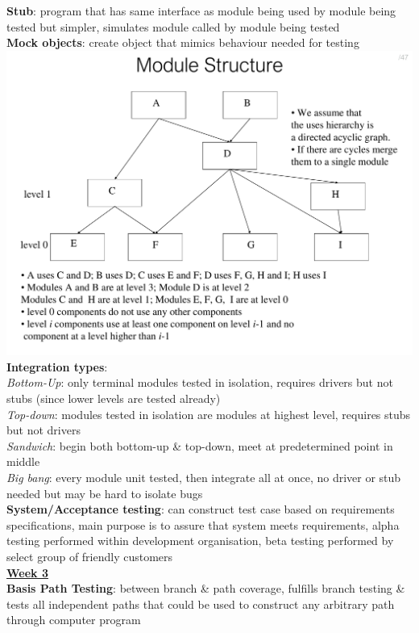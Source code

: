 \documentclass[a4paper]{article}
\begin{document}
\begin{multicols}{3}
        \textbf{Stub}: program that has same interface as module being used by module being tested but simpler, simulates module called by module being tested\\
        \textbf{Mock objects}: create object that mimics behaviour needed for testing\\
        \includegraphics[width=\linewidth]{102.pdf}\\
        \textbf{Integration types}:\\
        \textit{Bottom-Up}: only terminal modules tested in isolation, requires drivers but not stubs (since lower levels are tested already)\\
        \textit{Top-down}: modules tested in isolation are modules at highest level, requires stubs but not drivers\\
        \textit{Sandwich}: begin both bottom-up \& top-down, meet at predetermined point in middle\\
        \textit{Big bang}: every module unit tested, then integrate all at once, no driver or stub needed but may be hard to isolate bugs\\
        \textbf{System/Acceptance testing}: can construct test case based on requirements specifications, main purpose is to assure that system meets requirements, alpha testing performed within development organisation, beta testing performed by select group of friendly customers\\
        \underline{\textbf{Week 3}}\\
        \textbf{Basis Path Testing}: between branch \& path coverage, fulfills branch testing \& tests all independent paths that could be used to construct any arbitrary path through computer program\\

\end{multicols}
\end{document}
